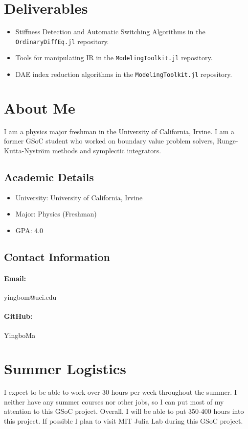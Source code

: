 \documentclass[12pt,a4paper]{article}
\begin{document}
\section{Deliverables}
\begin{itemize}
  \item Stiffness Detection and Automatic Switching Algorithms in
    the \texttt{OrdinaryDiffEq.jl} repository.
  \item Tools for manipulating IR in the \texttt{ModelingToolkit.jl}
    repository.
  \item DAE index reduction algorithms in the \texttt{ModelingToolkit.jl}
    repository.
\end{itemize}

\section{About Me}
I am a physics major freshman in the University of California, Irvine. I am a
former GSoC student who worked on boundary value problem solvers,
Runge-Kutta-Nystr{\"o}m methods and symplectic integrators.

\subsection{Academic Details}
\begin{itemize}
  \item University: University of California, Irvine
  \item Major: Physics (Freshman)
  \item GPA: 4.0
\end{itemize}

\subsection{Contact Information}
\paragraph{Email:} yingbom@uci.edu
\paragraph{GitHub:} YingboMa

\section{Summer Logistics}
I expect to be able to work over 30 hours per week throughout the summer. I
neither have any summer courses nor other jobs, so I can put most of my
attention to this GSoC project. Overall, I will be able to put 350-400 hours
into this project. If possible I plan to visit MIT Julia Lab during this GSoC
project.


\end{document}
